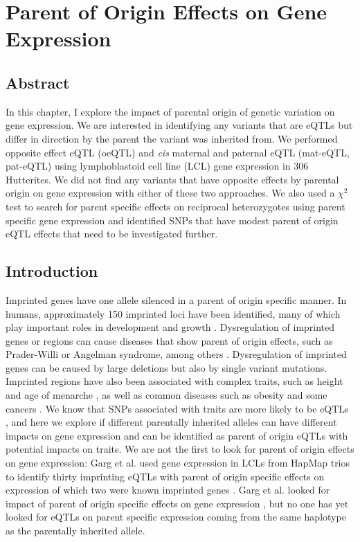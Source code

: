 
\chapter{Parent of Origin Effects on Gene Expression }\label{ch:poeqtl}
\section[Abstract]{Abstract}

In this chapter, I explore the impact of parental origin of genetic variation on gene expression. We are interested in identifying any variants that are eQTLs but differ in direction by the parent the variant was inherited from. We performed opposite effect eQTL (oeQTL) and \emph{cis} maternal and paternal eQTL (mat-eQTL, pat-eQTL) using lymphoblastoid cell line (LCL) gene expression in 306 Hutterites. We did not find any variants that have opposite effects by parental origin on gene expression with either of these two approaches. We also used a $\chi^2$ test to search for parent specific effects on reciprocal heterozygotes using parent specific gene expression and identified SNPs that have modest parent of origin eQTL effects that need to be investigated further.

\section{Introduction}\label{ch04-introduction}
Imprinted genes have one allele silenced in a parent of origin specific manner. In humans, approximately 150 imprinted loci have been identified, many of which play important roles in development and growth \citep{Falls1999,Peters2014,Benonisdottir:2016dz}. Dysregulation of imprinted genes or regions can cause diseases that show parent of origin effects, such as Prader-Willi or Angelman syndrome, among others \cite{Peters2014}. Dysregulation of imprinted genes can be caused by large deletions but also by single variant mutations. Imprinted regions have also been associated with complex traits, such as height and age of menarche \citep{Benonisdottir:2016dz,Zoledziewska:2015do}, as well as common diseases such as obesity and some cancers \citep{Peters2014}. We know that SNPs associated with traits are more likely to be eQTLs \citep{Nicolae2010}, and here we explore if different parentally inherited alleles can have different impacts on gene expression and can be identified as parent of origin eQTLs with potential impacts on traits. We are not the first to look for parent of origin effects on gene expression: Garg et al. used gene expression in LCLs from HapMap trios to identify thirty imprinting eQTLs with parent of origin specific effects on expression of which two were known imprinted genes \citep{Garg2012a}. Garg et al. looked for impact of parent of origin specific effects on gene expression \citep{Garg2012a}, but no one has yet looked for eQTLs on parent specific expression coming from the same haplotype as the parentally inherited allele. 
	
